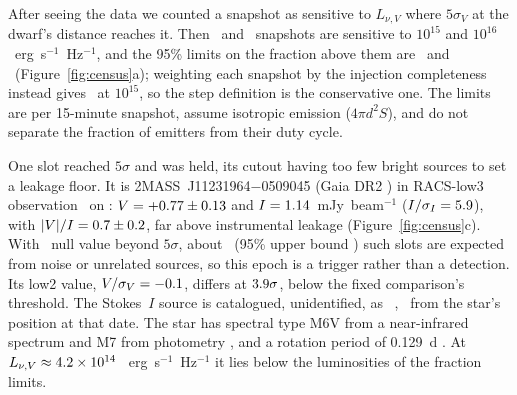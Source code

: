 \documentclass[RNAAS]{aastex631}
\begin{document}
After seeing the data we counted a snapshot as sensitive to $L_{\nu,V}$ where $5\sigma_V$ at the
dwarf's distance reaches it. Then \ucdvRealNeffFifteen\ and \ucdvRealNeffSixteen\ snapshots are
sensitive to $10^{15}$ and $10^{16}$~erg~s$^{-1}$~Hz$^{-1}$, and the 95\% limits on the fraction
above them are \ucdvRealFracFifteen\ and \ucdvRealFracSixteen\ (Figure~\ref{fig:census}a);
weighting each snapshot by the injection completeness instead gives \ucdvRealFracCwFifteen\ at
$10^{15}$, so the step definition is the conservative one. The limits are per 15-minute snapshot, assume isotropic emission ($4\pi d^2S$), and do
not separate the fraction of emitters from their duty cycle.

One slot reached $5\sigma$ and was held, its cutout having too few bright sources to set a
leakage floor. It is 2MASS~J11231964$-$0509045 (Gaia DR2 \ucdvRealDetGaia) in RACS-low3
observation \ucdvRealDetObs\ on \ucdvRealDetDate: $V=+0.77\pm0.13$ and
$I=1.14$~mJy~beam$^{-1}$ ($I/\sigma_I=5.9$), with $|V|/I=0.7
\pm0.2$, far above instrumental leakage (Figure~\ref{fig:census}c). With
\ucdvRealNullNGeFive\ null value beyond $5\sigma$, about \ucdvRealChanceGeFive\ (95\% upper bound \ucdvRealChanceGeFiveUpper) such slots are
expected from noise or unrelated sources, so this epoch is a trigger rather than a detection. Its low2 value,
$V/\sigma_V=-0.1$, differs at $3.9\sigma$, below the fixed
comparison's threshold. The Stokes~$I$ source is catalogued, unidentified, as
\ucdvRealCatName\ \citep{thomson2026}, \ucdvRealCatOffset\arcsec\ from the star's position at
that date. The star has spectral type
M6V from a near-infrared spectrum \citep{davoudi2025} and M7 from photometry \citep{reyle2018},
and a rotation period of 0.129~d \citep{newton2018}. At $L_{\nu,V}\approx4.2\times10^{14}$
~erg~s$^{-1}$~Hz$^{-1}$ it lies below the luminosities of the fraction limits.
\end{document}
